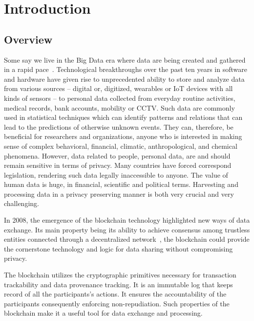 \chapter{Introduction}
\label{introduction}

\section{Overview}
\label{introduction:overview}

Some say we live in the Big Data era where data are being created and gathered in a rapid pace~\cite{10.1109/SPW.2015.27}. Technological breakthroughs over the past ten years in software and hardware have given rise to unprecedented ability to store and analyze data from various sources -- digital or, digitized, wearables or IoT devices with all kinds of sensors -- to personal data collected from everyday routine activities, medical records, bank accounts, mobility or CCTV. Such data are commonly used in statistical techniques which can identify patterns and relations that can  lead to the predictions of otherwise unknown events. They can, therefore, be beneficial for researchers and organizations, anyone who is interested in making sense of complex behavioral, financial, climatic, anthropological, and chemical phenomena. However, data related to people, personal data, are and should remain sensitive in terms of privacy. Many countries have forced correspond legislation, rendering such data legally inaccessible to anyone. The value of human data is huge, in financial, scientific and political terms. Harvesting and processing data in a privacy preserving manner is both very crucial and very challenging.

In 2008, the emergence of the blockchain technology highlighted new ways of data exchange. Its main property being its ability to achieve consensus among trustless entities connected through a decentralized network~\cite{10.1007/978-3-662-46803-6_10}, the blockchain could provide the cornerstone technology and logic for data sharing without compromising privacy.

The blockchain utilizes the cryptographic primitives necessary for transaction trackability and data provenance tracking. It is an immutable log that keeps record of all the participants's actions. It ensures the accountability of the participants consequently enforcing non-repudiation. Such properties of the blockchain make it a useful tool for data exchange and processing.


